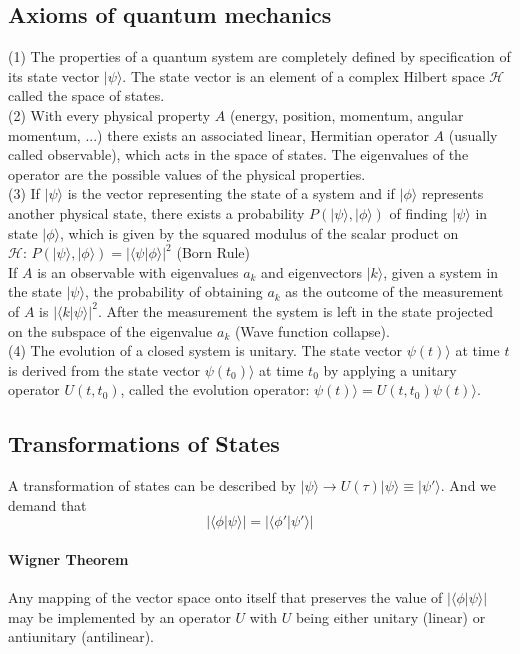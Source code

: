 \documentclass{article}
\begin{document}
\subsection{Axioms of quantum mechanics}
(1) The properties of a quantum system are completely defined by specification of its state vector $|\psi\rangle$. The state vector is an element of a complex Hilbert space $\mathcal{H}$ called the space of states.\\
(2) With every physical property $A$ (energy, position, momentum, angular momentum, ...) there exists an associated linear, Hermitian operator $A$ (usually called observable), which acts in the space of states. The eigenvalues of the operator are the possible values of the physical properties.\\
(3) If $|\psi\rangle$ is the vector representing the state of a system and if $|\phi\rangle$ represents another physical state, there exists a probability $P(|\psi\rangle,|\phi\rangle)$ of finding $|\psi\rangle$ in state $|\phi\rangle$, which is given by the squared modulus of the scalar product on $\mathcal{H}: \, P(|\psi\rangle,|\phi\rangle) = |\langle \psi | \phi \rangle|^2$ (Born Rule)\\
If $A$ is an observable with eigenvalues $a_k$ and eigenvectors $|k\rangle$, given a system in the state $|\psi\rangle$, the probability of obtaining $a_k$ as the outcome of the measurement of $A$ is $|\langle k | \psi \rangle|^2$. After the measurement
the system is left in the state projected on the subspace of the eigenvalue $a_k$ (Wave function collapse).\\
(4) The evolution of a closed system is unitary. The state vector $\psi(t)\rangle$ at time $t$ is derived from the state vector $\psi(t_0)\rangle$ at time $t_0$ by applying a unitary operator $U(t,t_0)$, called the evolution operator: $\psi(t)\rangle = U(t,t_0) \psi(t)\rangle$.

\subsection{Transformations of States}
A transformation of states can be described by $|\psi\rangle \to U(\tau) | \psi \rangle \equiv | \psi' \rangle$. And we demand that
\[|\langle \phi | \psi \rangle| = |\langle \phi' | \psi' \rangle|\]
\paragraph{Wigner Theorem}
Any mapping of the vector space onto itself that preserves the value of $|\langle \phi | \psi \rangle|$ may be implemented by an operator $U$ with $U$ being either unitary (linear) or antiunitary (antilinear).
\end{document}
